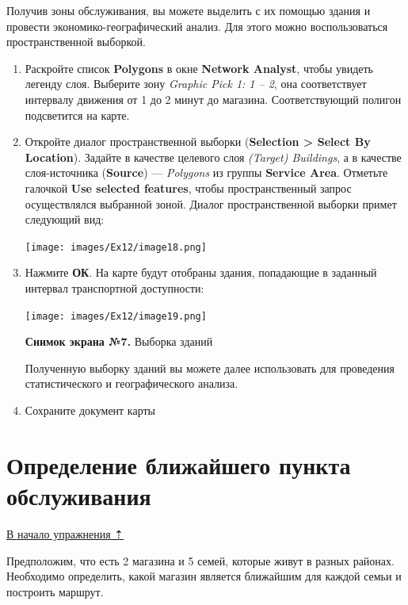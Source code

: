 \documentclass[12pt,]{book}
\begin{document}
Получив зоны обслуживания, вы можете выделить с их помощью здания и провести экономико-географический анализ. Для этого можно воспользоваться пространственной выборкой.

\begin{enumerate}
\def\labelenumi{\arabic{enumi}.}
\item
  Раскройте список \textbf{Polygons} в окне \textbf{Network Analyst}, чтобы увидеть легенду слоя. Выберите зону \emph{Graphic Pick 1: 1 -- 2}, она соответствует интервалу движения от 1 до 2 минут до магазина. Соответствующий полигон подсветится на карте.
\item
  Откройте диалог пространственной выборки (\textbf{Selection \textgreater{} Select By Location}). Задайте в качестве целевого слоя \emph{(Target) Buildings}, а в качестве слоя-источника (\textbf{Source}) --- \emph{Polygons} из группы \textbf{Service Area}. Отметьте галочкой \textbf{Use selected features}, чтобы пространственный запрос осуществлялся выбранной зоной. Диалог пространственной выборки примет следующий вид:

  \texttt{[image: images/Ex12/image18.png]}
\item
  Нажмите \textbf{ОК}. На карте будут отобраны здания, попадающие в заданный интервал транспортной доступности:

  \texttt{[image: images/Ex12/image19.png]}

  \textbf{Снимок экрана №7.} Выборка зданий

  Полученную выборку зданий вы можете далее использовать для проведения статистического и географического анализа.
\item
  Сохраните документ карты
\end{enumerate}

\hypertarget{network-analysis-facility}{%
\section{Определение ближайшего пункта обслуживания}\label{network-analysis-facility}}

\protect\hyperlink{network-analysis}{В начало упражнения ⇡}

Предположим, что есть 2 магазина и 5 семей, которые живут в разных районах. Необходимо определить, какой магазин является ближайшим для каждой семьи и построить маршрут.
\end{document}
